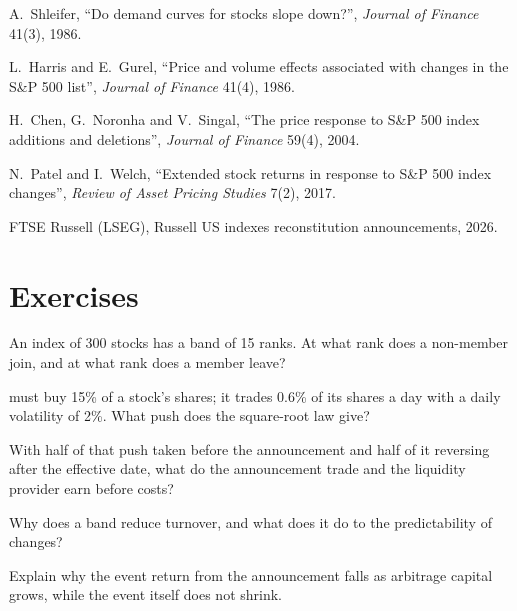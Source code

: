 \begin{omsources}
\item A.~Shleifer, ``Do demand curves for stocks slope down?'', \emph{Journal of Finance} 41(3), 1986.
\item L.~Harris and E.~Gurel, ``Price and volume effects associated with changes in the S\&P 500 list'', \emph{Journal of Finance} 41(4), 1986.
\item H.~Chen, G.~Noronha and V.~Singal, ``The price response to S\&P 500 index additions and deletions'', \emph{Journal of Finance} 59(4), 2004.
\item N.~Patel and I.~Welch, ``Extended stock returns in response to S\&P 500 index changes'', \emph{Review of Asset Pricing Studies} 7(2), 2017.
\item FTSE Russell (LSEG), Russell US indexes reconstitution announcements, 2026.
\end{omsources}

\section{Exercises}

\begin{exercise}[$\star$]\label{exo:s1:index-rebalancing:1}
An index of 300 stocks has a band of 15 ranks. At what rank does a non-member join, and at what rank does a member leave?
\end{exercise}

\begin{exercise}[$\star$]\label{exo:s1:index-rebalancing:2}
 must buy 15\% of a stock's shares; it trades 0.6\% of its shares a day with a daily volatility of 2\%. What push does the square-root law give?
\end{exercise}

\begin{exercise}[$\star$]\label{exo:s1:index-rebalancing:3}
With half of that push taken before the announcement and half of it reversing after the effective date, what do the announcement trade and the liquidity
provider earn before costs?
\end{exercise}

\begin{exercise}[$\star\star$]\label{exo:s1:index-rebalancing:4}
Why does a band reduce turnover, and what does it do to the predictability of changes?
\end{exercise}

\begin{exercise}[$\star\star$]\label{exo:s1:index-rebalancing:5}
Explain why the event return from the announcement falls as arbitrage capital grows, while the event itself does not shrink.
\end{exercise}

